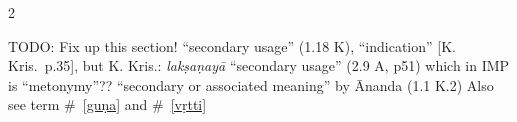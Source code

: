 \documentclass[10pt]{article}
\begin{document}
\begin{multicols}{2}
\begin{enumerate}[
			leftmargin=0em,
			rightmargin=0em,
		]

		 TODO: Fix up this section! ``secondary usage'' (1.18 K), ``indication'' [K. Kris.\ p.35],
		but K. Kris.: \textit{lakṣaṇayā} ``secondary usage'' (2.9 A, p51) which in IMP is ``metonymy''??
		``secondary or associated meaning'' by Ānanda (1.1 K.2)
		Also see term \#~\ref{guṇa} and \#~\ref{vṛtti}



\end{enumerate}
\end{multicols}
\end{document}
